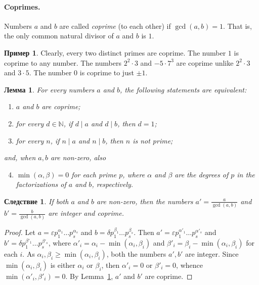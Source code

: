 \documentclass[12pt,notitlepage]{article}
\theoremstyle{plain}
\newtheorem{lemma}[thm]{Лемма}
\newtheorem{corr}[thm]{Следствие}
\theoremstyle{definition}
\newtheorem{exm}[thm]{Пример}
\theoremstyle{plain}
\newcommand{\N}{\mathbb{N}}
\newcommand{\eps}{\varepsilon}
\newcommand{\1}{\mathbf{1}}
\newcommand{\0}{\mathbf{0}}
\newcommand{\dvd}{\mathop{\mid}}
\begin{document}
\paragraph{Coprimes.} Numbers $a$ and $b$ are called \emph{coprime} (to each other) if $\gcd(a, b) = 1$. That is, the only common natural divisor of $a$ and $b$ is $1$.
\begin{exm}
	Clearly, every two distinct primes are coprime. The number $1$ is coprime to any number. The numbers $2^2 \cdot 3$ and $- 5 \cdot 7^3$ are coprime unlike $2^2 \cdot 3$ and $3 \cdot 5$. The number $0$ is coprime to just $\pm 1$.
\end{exm}

\begin{lemma}\label{L5:coprime}
	For every numbers $a$ and $b$, the following statements are equivalent:
	\begin{enumerate}
		\item $a$ and $b$ are coprime;
		\item for every $d \in \N$, if $d \dvd a$ and $d \dvd b$, then $d = 1$;
		\item for every $n$, if $n \dvd a$ and $n \dvd b$, then $n$ is not prime;
	\end{enumerate}
	and, when $a, b$ are non-zero, also
	\begin{enumerate}
		\setcounter{enumi}{3}
		\item $\min(\alpha, \beta) = 0$ for each prime $p$, where $\alpha$ and $\beta$ are the degrees of $p$ in the factorizations of $a$ and $b$, respectively.
	\end{enumerate}
\end{lemma}

\begin{corr}
	If both $a$ and $b$ are non-zero, then the numbers $a' = \frac{a}{\gcd(a, b)}$ and $b' = \frac{b}{\gcd(a, b)}$ are integer and coprime.
\end{corr}
\begin{proof}
	Let $a = \eps p^{\alpha_1}_1\ldots p^{\alpha_s}_s$ and $b = \delta p^{\beta_1}_1\ldots p^{\beta_s}_s$. Then $a' = \eps p^{\alpha'_1}_1\ldots p^{\alpha'_s}_s$ and $b' = \delta p^{\beta'_1}_1\ldots p^{\beta'_s}_s$, where $\alpha'_i = \alpha_i - \min(\alpha_i, \beta_i)$ and $\beta'_i = \beta_i - \min(\alpha_i, \beta_i)$ for each $i$. As $\alpha_i, \beta_i \geq \min(\alpha_i, \beta_i)$, both the numbers $a', b'$ are integer. Since $\min(\alpha_i, \beta_i)$ is either $\alpha_i$ or $\beta_i$, then $\alpha'_i = 0$ or $\beta'_i = 0$, whence $\min(\alpha'_i, \beta'_i) = 0$. By Lemma~\ref{L5:coprime}, $a'$ and $b'$ are coprime.
\end{proof}
\end{document}

